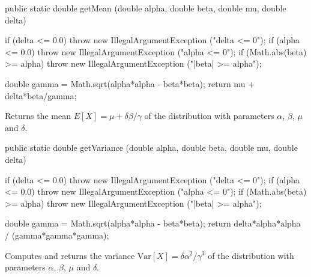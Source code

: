 \begin{htmlonly}
\end{htmlonly}
\begin{code}

   public static double getMean (double alpha, double beta, double mu,
                                 double delta)\begin{hide} {
      if (delta <= 0.0)
         throw new IllegalArgumentException ("delta <= 0");
      if (alpha <= 0.0)
         throw new IllegalArgumentException ("alpha <= 0");
      if (Math.abs(beta) >= alpha)
         throw new IllegalArgumentException ("|beta| >= alpha");

      double gamma = Math.sqrt(alpha*alpha - beta*beta);
      return mu + delta*beta/gamma;
   }\end{hide}
\end{code}
\begin{tabb} Returns the mean $E[X] = \mu + \delta\beta/\gamma$ of the
  \nig{} distribution with parameters $\alpha$, $\beta$, $\mu$ and $\delta$.
\end{tabb}
\begin{htmlonly}
\end{htmlonly}
\begin{code}

   public static double getVariance (double alpha, double beta, double mu,
                                     double delta)\begin{hide} {
      if (delta <= 0.0)
         throw new IllegalArgumentException ("delta <= 0");
      if (alpha <= 0.0)
         throw new IllegalArgumentException ("alpha <= 0");
      if (Math.abs(beta) >= alpha)
         throw new IllegalArgumentException ("|beta| >= alpha");

      double gamma = Math.sqrt(alpha*alpha - beta*beta);
      return delta*alpha*alpha / (gamma*gamma*gamma);
   }\end{hide}
\end{code}
\begin{tabb}  Computes and returns the variance $\mbox{Var}[X] =
  \delta\alpha^2 / \gamma^3$ of the \nig{} distribution with parameters
 $\alpha$, $\beta$,  $\mu$ and $\delta$.
\end{tabb}
\begin{htmlonly}
   \return{the variance of the normal inverse gaussian distribution
   $\mbox{Var}[X] = \delta\alpha^2 / \gamma^3$
\end{htmlonly}
